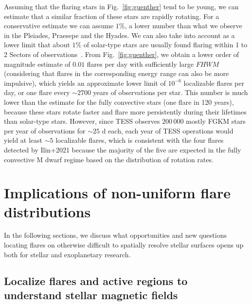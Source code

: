 \documentclass[proof]{WileyASNA-v1}
\begin{document}
Assuming that the flaring stars in Fig.~\ref{fig:guenther} tend to be young, we can estimate that a similar fraction of these stars are rapidly rotating. For a conservative estimate we can assume $1\%$, a lower number than what we observe in the Pleiades, Praesepe and the Hyades. We can also take into account as a lower limit that about $1\%$ of solar-type stars are usually found flaring within 1 to 2 Sectors of observations~\citep{tu2021}. From Fig.~\ref{fig:guenther}, we obtain a lower order of magnitude estimate of $0.01$ flares per day with sufficiently large $FHWM$ (considering that flares in the corresponding energy range can also be more impulsive), which yields an approximate lower limit of $10^{-6}$ localizable flares per day, or one flare every $\sim2 700$ years of observations per star. This number is much lower than the estimate for the fully convective stars (one flare in 120 years), because these stars rotate faster and flare more persistently during their lifetimes than solar-type stars. However, since TESS observes $200\,000$ mostly FGKM stars per year of observations for $\sim 25$ d each, each year of TESS operations would yield at least $\sim 5$ localizable flares, which is consistent with the four flares detected by Ilin+2021 because the majority of the five are expected in the fully convective M dwarf regime based on the distribution of rotation rates. 

\section{Implications of non-uniform flare distributions}
\label{sec:implications}
In the following sections, we discuss what opportunities and new questions locating flares on otherwise difficult to spatially resolve stellar surfaces opens up both for stellar and exoplanetary research.


\subsection{Localize flares and active regions to understand stellar magnetic fields}\label{sec:mf}
\end{document}

